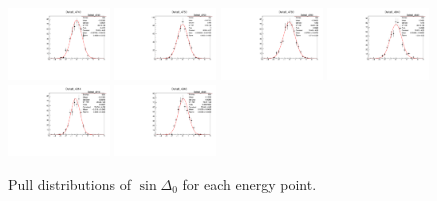 \begin{figure}[h]
    \includegraphics[width=0.24\textwidth]{figure/io/polarization/pull_polarization_delta0_4740.pdf}
    \includegraphics[width=0.24\textwidth]{figure/io/polarization/pull_polarization_delta0_4750.pdf}
    \includegraphics[width=0.24\textwidth]{figure/io/polarization/pull_polarization_delta0_4780.pdf}
    \includegraphics[width=0.24\textwidth]{figure/io/polarization/pull_polarization_delta0_4840.pdf}
    \includegraphics[width=0.24\textwidth]{figure/io/polarization/pull_polarization_delta0_4914.pdf}
    \includegraphics[width=0.24\textwidth]{figure/io/polarization/pull_polarization_delta0_4946.pdf}
    \caption{Pull distributions of $\sin\Delta_0$ for each energy point.}
\label{fig:io_pull_delta0}
\end{figure}

